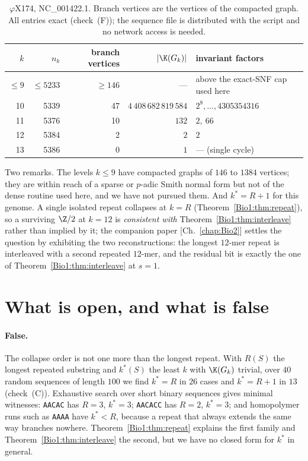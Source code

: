 \begin{table}[ht]
\centering\small
\begin{tabular}{rrrrl}
\toprule
$k$ & $n_k$ & branch vertices & $|\K(G_k)|$ & invariant factors\\
\midrule
$\le9$ & $\le5233$ & $\ge146$ & --- & above the exact-SNF cap used here\\
10 & 5339 & 47 & $4\,408\,682\,819\,584$ & $2^{8},\dots,4305354316$\\
11 & 5376 & 10 & $132$ & $2,\ 66$\\
12 & 5384 &  2 & $2$   & $2$\\
13 & 5386 &  0 & $1$   & --- (single cycle)\\
\bottomrule
\end{tabular}
\caption{$\varphi$X174, NC\_001422.1. Branch vertices are the vertices of the compacted
graph. All entries exact (check~(F)); the sequence file is distributed with the script and
no network access is needed.}
\label{Bio1:tab:phix}
\end{table}

Two remarks. The levels $k\le9$ have compacted graphs of $146$ to $1384$ vertices; they are
within reach of a sparse or $p$-adic Smith normal form but not of the dense routine used
here, and we have not pursued them. And $k^{*}=R+1$ for this genome. A single isolated repeat collapses at $k=R$
(Theorem~\ref{Bio1:thm:repeat}), so a surviving $\Z/2$ at $k=12$ is \emph{consistent with}
Theorem~\ref{Bio1:thm:interleave} rather than implied by it; the companion paper [Ch.~\ref{chap:Bio2}]
settles the question by exhibiting the two reconstructions: the longest $12$-mer repeat is
interleaved with a second repeated $12$-mer, and the residual bit is exactly the one of
Theorem~\ref{Bio1:thm:interleave} at $s=1$.

\section{What is open, and what is false}\label{Bio1:sec:open}

\paragraph{False.} The collapse order is not one more than the longest repeat. With $R(S)$
the longest repeated substring and $k^{*}(S)$ the least $k$ with $\K(G_k)$ trivial, over
$40$ random sequences of length $100$ we find $k^{*}=R$ in $26$ cases and $k^{*}=R+1$ in
$13$ (check~(C)). Exhaustive search over short binary sequences gives minimal witnesses:
\texttt{AACAC} has $R=3$, $k^{*}=3$; \texttt{AACACC} has $R=2$, $k^{*}=3$; and homopolymer
runs such as \texttt{AAAA} have $k^{*}<R$, because a repeat that always extends the same
way branches nowhere. Theorem~\ref{Bio1:thm:repeat} explains the first family and
Theorem~\ref{Bio1:thm:interleave} the second, but we have no closed form for $k^{*}$ in general.

